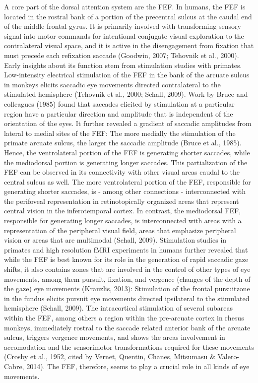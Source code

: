 \documentclass[a4paper, 12pt]{scrreprt}
\begin{document}
A core part of the dorsal attention system are the FEF. In humans, the FEF is located in the rostral bank of a portion of the precentral sulcus at the caudal end of the middle frontal gyrus. It is primarily involved with transforming sensory signal into motor commands for intentional conjugate visual exploration to the contralateral visual space, and it is active in the disengagement from fixation that must precede each refixation saccade (Goodwin, 2007; Tehovnik et al., 2000). Early insights about its function stem from stimulation studies with primates. Low-intensity electrical stimulation of the FEF in the bank of the arcuate sulcus in monkeys elicits saccadic eye movements directed contralateral to the stimulated hemisphere (Tehovnik et al., 2000; Schall, 2009). Work by Bruce and colleagues (1985) found that saccades elicited by stimulation at a particular region have a particular direction and amplitude that is independent of the orientation of the eyes. It further revealed a gradient of saccadic amplitudes from lateral to medial sites of the FEF: The more medially the stimulation of the primate arcuate sulcus, the larger the saccadic amplitude (Bruce et al., 1985). Hence, the ventrolateral portion of the FEF is generating shorter saccades, while the mediodorsal portion is generating longer saccades. This partialization of the FEF can be observed in its connectivity with other visual areas caudal to the central sulcus as well. The more ventrolateral portion of the FEF, responsible for generating shorter saccades, is - among other connections - interconnected with the perifoveal representation in retinotopically organized areas that represent central vision in the inferotemporal cortex. In contrast, the mediodorsal FEF, responsible for generating longer saccades, is interconnected with areas with a representation of the peripheral visual field, areas that emphasize peripheral vision or areas that are multimodal (Schall, 2009).
Stimulation studies in primates and high resolution fMRI experiments in humans further revealed that while the FEF is best known for its role in the generation of rapid saccadic gaze shifts, it also contains zones that are involved in the  control of other types of eye movements, among them pursuit, fixation, and vergence (changes of the depth of the gaze) eye movements (Krauzlis, 2013): Stimulation of the frontal pursuitzone in the fundus elicits pursuit eye movements directed ipsilateral to the stimulated hemisphere (Schall, 2009). The intracortical stimulation of several subareas within the FEF, among others a region within the pre-arcuate cortex in rhesus monkeys, immediately rostral to the saccade related anterior bank of the arcuate sulcus, triggers vergence movements, and shows the areas involvement in accomodation and the sensorimotor transformations required for these movements (Crosby et al., 1952, cited by Vernet, Quentin, Chanes, Mitsumasu \& Valero-Cabre, 2014). The FEF, therefore, seems to play a crucial role in all kinds of eye movements. \newline
\end{document}
